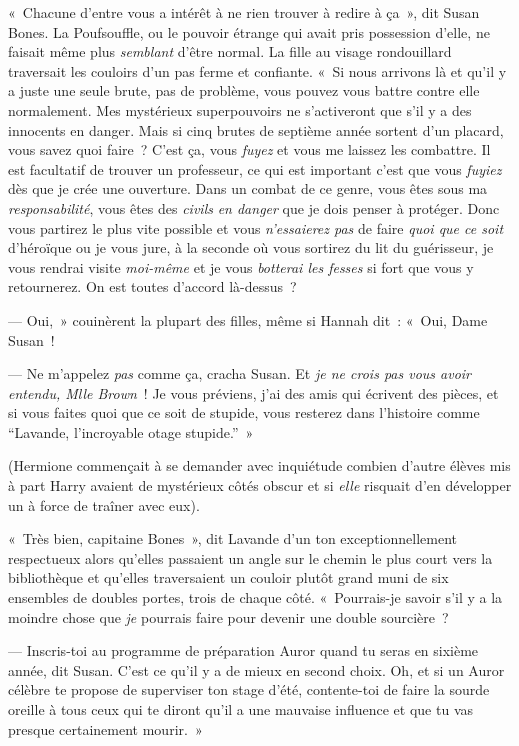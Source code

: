 «~Chacune d'entre vous a intérêt à ne rien trouver à redire à ça~», dit Susan Bones.
La Poufsouffle, ou le pouvoir étrange qui avait pris possession d'elle, ne faisait même plus \emph{semblant} d'être normal.
La fille au visage rondouillard traversait les couloirs d'un pas ferme et confiante.
«~Si nous arrivons là et qu'il y a juste une seule brute, pas de problème, vous pouvez vous battre contre elle normalement.
Mes mystérieux superpouvoirs ne s'activeront que s'il y a des innocents en danger.
Mais si cinq brutes de septième année sortent d'un placard, vous savez quoi faire~?
C'est ça, vous \emph{fuyez} et vous me laissez les combattre.
Il est facultatif de trouver un professeur, ce qui est important c'est que vous \emph{fuyiez} dès que je crée une ouverture.
Dans un combat de ce genre, vous êtes sous ma \emph{responsabilité}, vous êtes des \emph{civils} \emph{en danger} que je dois penser à protéger.
Donc vous partirez le plus vite possible et vous \emph{n'essaierez pas} de faire \emph{quoi que ce soit} d'héroïque ou je vous jure, à la seconde où vous sortirez du lit du guérisseur, je vous rendrai visite \emph{moi-même} et je vous \emph{botterai les fesses} si fort que vous y retournerez.
On est toutes d'accord là-dessus~?

--- Oui,~» couinèrent la plupart des filles, même si Hannah dit~: «~Oui, Dame Susan~!

--- Ne m'appelez \emph{pas} comme ça, cracha Susan.
Et \emph{je ne crois pas vous avoir entendu, Mlle Brown}~!
Je vous préviens, j'ai des amis qui écrivent des pièces, et si vous faites quoi que ce soit de stupide, vous resterez dans l'histoire comme “Lavande, l'incroyable otage stupide.”~»

(Hermione commençait à se demander avec inquiétude combien d'autre élèves mis à part Harry avaient de mystérieux côtés obscur et si \emph{elle} risquait d'en développer un à force de traîner avec eux).

«~Très bien, capitaine Bones~», dit Lavande d'un ton exceptionnellement respectueux alors qu'elles passaient un angle sur le chemin le plus court vers la bibliothèque et qu'elles traversaient un couloir plutôt grand muni de six ensembles de doubles portes, trois de chaque côté.
«~Pourrais-je savoir s'il y a la moindre chose que \emph{je} pourrais faire pour devenir une double sourcière~?

--- Inscris-toi au programme de préparation Auror quand tu seras en sixième année, dit Susan.
C'est ce qu'il y a de mieux en second choix.
Oh, et si un Auror célèbre te propose de superviser ton stage d'été, contente-toi de faire la sourde oreille à tous ceux qui te diront qu'il a une mauvaise influence et que tu vas presque certainement mourir.~»

